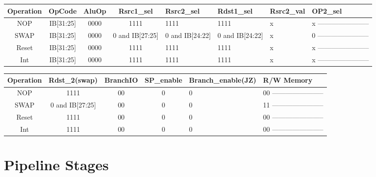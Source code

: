 \documentclass[12pt]{report}
\begin{document}
\begin{itemize}
        \begin{center}
        \begin{tabular}{||c| c| c| c| p{40mm}||} 
        \hline
        Operation & OpCode & AluOp & Rsrc1_sel & Rsrc2_sel & Rdst1_sel & Rsrc2_val & OP2_sel  \\ [0.5ex] 
        \hline\hline
        NOP & IB[31:25] & 0000 & 1111 & 1111 & 1111 & x & x ----------------------- \\
        \hline
        SWAP & IB[31:25] & 0000 & 0 and IB[27:25] & 0 and IB[24:22] & 0 and IB[24:22] & x & 0 ----------------------- \\
        \hline
        Reset & IB[31:25] & 0000 & 1111 & 1111 & 1111 & x & x ----------------------- \\
        \hline
        Int & IB[31:25] & 0000 & 1111 & 1111 & 1111 & x & x ----------------------- \\
        \hline
        \end{tabular}
        \end{center}

        \begin{center}
        \begin{tabular}{||c| c| c| c| p{40mm}||} 
        \hline
        Operation & Rdst_2(swap) & BranchIO & SP_enable & Branch_enable(JZ) & R/W Memory  \\ [0.5ex] 
        \hline\hline
        NOP & 1111 & 00 & 0 & 0 & 00 ----------------------- \\
        \hline
        SWAP & 0 and IB[27:25] & 00 & 0 & 0 & 11 ----------------------- \\
        \hline
        Reset & 1111 & 00 & 0 & 0 & 00 ----------------------- \\
        \hline
        Int & 1111 & 00 & 0 & 0 & 00 ----------------------- \\
        \hline
        \end{tabular}
        \end{center}


\end{itemize}




\part{Pipeline Stages}
\end{document}
